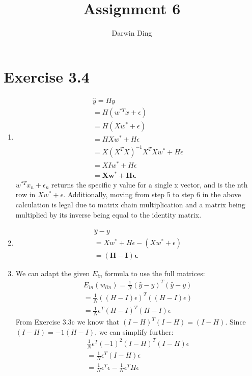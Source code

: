 \documentclass[12pt]{article}
\begin{document}
\title{Assignment 6}
\author{Darwin Ding}
\maketitle

\section*{Exercise 3.4}
\begin{enumerate}[label=(\alph*)]
	\item
	\begin{gather*}
		\hat{y} = Hy
		\\ = H(w^{*T}x + \epsilon)
		\\ = H(Xw^* + \epsilon)
		\\ = HXw^* + H\epsilon
		\\ = X(X^TX)^{-1}X^TXw^* + H\epsilon
		\\ = XIw^* + H\epsilon
		\\ = \boldsymbol{Xw^* + H\epsilon}
	\end{gather*}
	$w^{*T}x_n + \epsilon_n$ returns the specific y value for a single x vector, and is the nth row in $Xw^* + \epsilon$. Additionally, moving from step 5 to step 6 in the above calculation is legal due to matrix chain multiplication and a matrix being multiplied by its inverse being equal to the identity matrix.
	\item
	\begin{gather*}
		\hat{y} - y
		\\ = Xw^* + H\epsilon - (Xw^* + \epsilon)
		\\ = \boldsymbol{(H - I)\epsilon}
	\end{gather*}
	\item We can adapt the given $E_{in}$ formula to use the full matrices:
	\begin{gather*}
		E_{in}(w_{lin}) = \frac{1}{N}(\hat{y} - y)^T(\hat{y} - y)
		\\ = \frac{1}{N}((H - I)\epsilon)^T((H - I)\epsilon)
		\\ = \frac{1}{N}\epsilon^T(H - I)^T(H - I)\epsilon
	\end{gather*}
	From Exercise 3.3c we know that $(I - H)^T(I - H) = (I - H)$. Since $(I - H) = -1(H - I)$, we can simplify further:
	\begin{gather*}
		\frac{1}{N}\epsilon^T(-1)^2(I - H)^T(I - H)\epsilon
		\\ = \frac{1}{N}\epsilon^T(I - H)\epsilon
		\\ = \frac{1}{N}\epsilon^T\epsilon - \frac{1}{N}\epsilon^TH\epsilon

\end{gather*}
\end{enumerate}
\end{document}
